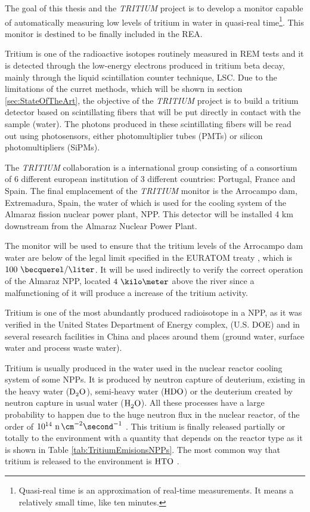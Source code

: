 The goal of this thesis and the \textit{TRITIUM} project is to develop a monitor capable of automatically measuring low levels of tritium in water in quasi-real time\footnote{Quasi-real time is an approximation of real-time measurements. It means a relatively small time, like ten minutes.}. This monitor is destined to be finally included in the REA.

Tritium is one of the radioactive isotopes routinely measured in REM tests and it is detected through the low-energy electrons produced in tritium beta decay, mainly through the liquid scintillation counter technique, LSC. Due to the limitations of the curret methods, which will be shown in section \ref{sec:StateOfTheArt}, the objective of the \textit{TRITIUM} project is to build a tritium detector based on scintillating fibers that will be put directly in contact with the sample (water). The photons produced in these scintillating fibers will be read out using photosensors, either photomultiplier tubes (PMTs) or silicon photomultipliers (SiPMs). 

The \textit{TRITIUM} collaboration is a international group consisting of a consortium of 6 different european institution of 3 different countries: Portugal, France and Spain. The final emplacement of the \textit{TRITIUM} monitor is the Arrocampo dam, Extremadura, Spain, the water of which is used for the cooling system of the Almaraz fission nuclear power plant, NPP. This detector will be installed 4 km downstream from the Almaraz Nuclear Power Plant.

The monitor will be used to ensure that the tritium levels of the Arrocampo dam  water are below of the legal limit specified in the EURATOM treaty \cite{100BqL}, which is $100~\becquerel/\liter$. It will be used indirectly to verify the correct operation of the Almaraz NPP, located $4~\kilo\meter$ above the river since a malfunctioning of it will produce a increase of the tritium activity.

Tritium is one of the most abundantly produced radioisotope in a NPP, as it was verified in the United States Department of Energy complex, (U.S. DOE) \cite{FiberDetector1a, FiberDetector1b} and in several research facilities in China \cite{CommonEmissionTritium} and places around them (ground water, surface water and process waste water).

Tritium is usually produced in the water used in the nuclear reactor cooling system of some NPPs. It is produced by neutron capture of deuterium, existing in the heavy water ($\ce{D_2 O}$), semi-heavy water ($\ce{H D O}$) or the deuterium created by neutron capture in usual water ($\ce{H_2 O}$). All these processes have a large probability to happen due to the huge neutron flux in the nuclear reactor, of the order of $10^{14} ~\ce{n} \, \cm^{-2} \second^{-1}$ \cite{CrossSeccionNeutrons}. This tritium is finally released partially or totally to the environment with a quantity that depends on the reactor type as it is shown in Table \ref{tab:TritiumEmisionsNPPs}. The most common way that tritium is released to the environment is $\ce{HTO}$ \cite{CommonEmissionTritium}.

